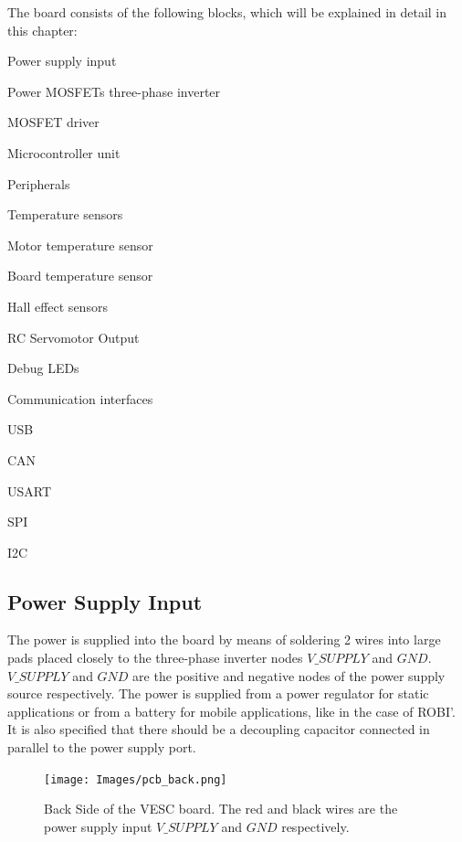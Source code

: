 The board consists of the following blocks, which will be explained in detail in this chapter:
\begin {enumerate}
	\item Power supply input
	\item Power MOSFETs three-phase inverter
	\item MOSFET driver
	\item Microcontroller unit
	\item Peripherals
		\item Hall effect sensors
		\item RC Servomotor Output
		\item Debug LEDs
	\end {aenumerate}
	\item Communication interfaces
	\begin {aenumerate}
		\item USB
		\item CAN
		\item USART
		\item SPI
		\item I2C
	\end {aenumerate}
\end {enumerate}

\subsection{Power Supply Input}
The power is supplied into the board by means of soldering 2 wires into large pads placed closely to the three-phase inverter nodes $V\_SUPPLY$ and $GND$. $V\_SUPPLY$ and $GND$ are the positive and negative nodes of the power supply source respectively. The power is supplied from a power regulator for static applications or from a battery for mobile applications, like in the case of ROBI'. It is also specified that there should be a decoupling capacitor connected in parallel to the power supply port.

\begin{figure}[htbp]
\centering
\texttt{[image: Images/pcb\_back.png]} 
\caption[VESC Back Side]{Back Side of the VESC board. The red and black wires are the power supply input $V\_SUPPLY$ and $GND$ respectively.}
\label{fig:pcb_back}
\end{figure}

